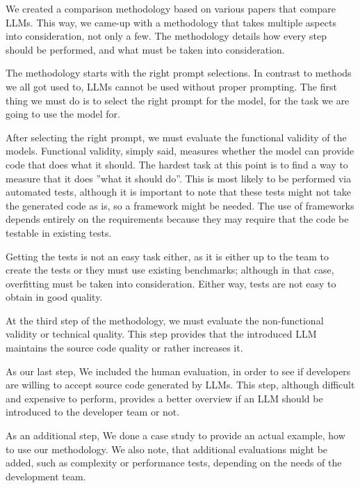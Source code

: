 We created a comparison methodology based on various papers that compare LLMs.
This way, we came-up with a methodology that takes multiple aspects into consideration, not only a few.
The methodology details how every step should be performed, and what must be taken into consideration.

The methodology starts with the right prompt selections.
In contrast to methods we all got used to, LLMs cannot be used without proper prompting.
The first thing we must do is to select the right prompt for the model, for the task we are going to use the model for.

After selecting the right prompt, we must evaluate the functional validity of the models.
Functional validity, simply said, measures whether the model can provide code that does what it should.
The hardest task at this point is to find a way to measure that it does ''what it should do''.
This is most likely to be performed via automated tests, although it is important to note that these tests might not take the generated code as is, so a framework might be needed.
The use of frameworks depends entirely on the requirements because they may require that the code be testable in existing tests.

Getting the tests is not an easy task either, as it is either up to the team to create the tests or they must use existing benchmarks; although in that case, overfitting must be taken into consideration.
Either way, tests are not easy to obtain in good quality.

At the third step of the methodology, we must evaluate the non-functional validity or technical quality.
This step provides that the introduced LLM maintains the source code quality or rather increases it.

As our last step, We included the human evaluation, in order to see if developers are willing to accept source code generated by LLMs.
This step, although difficult and expensive to perform, provides a better overview if an LLM should be introduced to the developer team or not.

As an additional step, We done a case study to provide an actual example, how to use our methodology.
We also note, that additional evaluations might be added, such as complexity or performance tests, depending on the needs of the development team.
